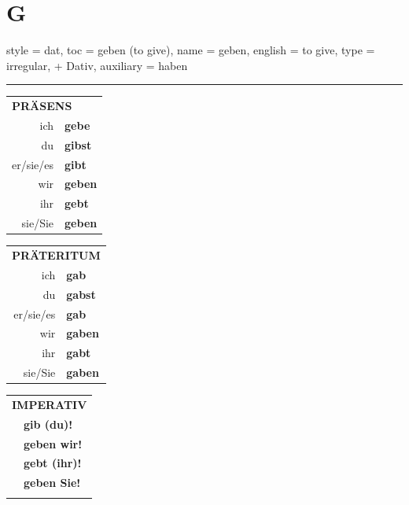 \section{G}

\begin{verbentry}{
  style = {dat},
  toc = {geben (to give)},
  name = {geben},
  english = {to give},
  type = {irregular, + Dativ},
  auxiliary = {haben}
}
 
    
     \vspace{5pt}

    \hrule
    
    \vspace{5pt}

  \begin{tabular}{rl}
     \multicolumn{2}{l}{\textbf{PRÄSENS} }\\
    ich & \textbf{gebe}\\
    du & \textbf{gibst}\\
    er/sie/es & \textbf{gibt}\\
    wir & \textbf{geben}\\
    ihr & \textbf{gebt}\\
    sie/Sie & \textbf{geben}\\
  \end{tabular}
  \hfill
     \begin{tabular}{rl}
    \multicolumn{2}{l}{\textbf{PRÄTERITUM} }\\
    ich & \textbf{gab}\\
    du & \textbf{gabst}\\
    er/sie/es & \textbf{gab}\\
    wir & \textbf{gaben}\\
    ihr & \textbf{gabt}\\
    sie/Sie & \textbf{gaben}\\
  \end{tabular}
  \hfill
  \begin{tabular}{rl}
     \multicolumn{2}{l}{\textbf{IMPERATIV} }\\
   & \textbf{gib (du)!}\\
   & \textbf{geben wir!}\\
   & \textbf{gebt (ihr)!}\\
   & \textbf{geben Sie!}\\
   & \vspace{10pt}
  \end{tabular}

    \vspace{10pt}


\end{verbentry}
